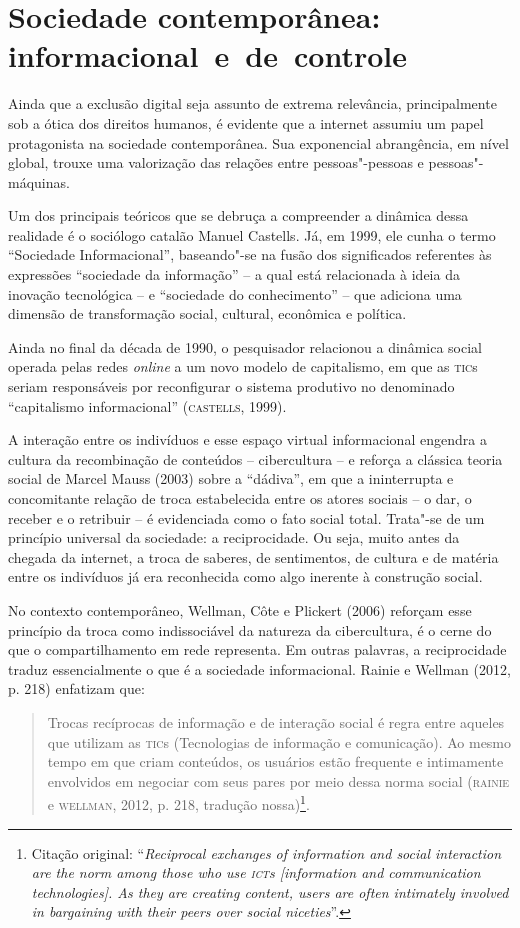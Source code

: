 \section{Sociedade contemporânea: informacional~e~de~controle}

\noindent{}Ainda que a exclusão digital seja assunto de extrema relevância,
principalmente sob a ótica dos direitos humanos, é evidente que a
internet assumiu um papel protagonista na sociedade contemporânea. Sua
exponencial abrangência, em nível global, trouxe uma valorização das
relações entre pessoas"-pessoas e pessoas"-máquinas.

Um dos principais teóricos que se debruça a compreender a dinâmica dessa
realidade é o sociólogo catalão Manuel Castells. Já, em 1999, ele cunha
o termo ``Sociedade Informacional'', baseando"-se na fusão dos
significados referentes às expressões ``sociedade da informação'' -- a
qual está relacionada à ideia da inovação tecnológica -- e ``sociedade do
conhecimento'' -- que adiciona uma dimensão de transformação social,
cultural, econômica e política.

Ainda no final da década de 1990, o pesquisador relacionou a dinâmica
social operada pelas redes \emph{online} a um novo modelo de capitalismo, em
que as \textsc{tic}s seriam responsáveis por reconfigurar o sistema produtivo no
denominado ``capitalismo informacional'' (\textsc{castells}, 1999).

A interação entre os indivíduos e esse espaço virtual informacional
engendra a cultura da recombinação de conteúdos -- cibercultura -- e
reforça a clássica teoria social de Marcel Mauss (2003) sobre a
``dádiva'', em que a ininterrupta e concomitante relação de troca
estabelecida entre os atores sociais -- o dar, o receber e o retribuir
-- é evidenciada como o fato social total. Trata"-se de um princípio
universal da sociedade: a reciprocidade. Ou seja, muito antes da chegada
da internet, a troca de saberes, de sentimentos, de cultura e de matéria
entre os indivíduos já era reconhecida como algo inerente à construção
social.

No contexto contemporâneo, Wellman, Côte e Plickert (2006) reforçam esse
princípio da troca como indissociável da natureza da cibercultura, é o
cerne do que o compartilhamento em rede representa. Em outras palavras,
a reciprocidade traduz essencialmente o que é a sociedade informacional.
Rainie e Wellman (2012, p. 218) enfatizam que:

\begin{quote}
Trocas recíprocas de informação e de interação social é regra entre
aqueles que utilizam as \textsc{tic}s (Tecnologias de informação e comunicação).
Ao mesmo tempo em que criam conteúdos, os usuários estão frequente e
intimamente envolvidos em negociar com seus pares por meio dessa norma
social (\textsc{rainie} e \textsc{wellman}, 2012, p. 218, tradução nossa)\footnote{Citação
  original: ``\emph{Reciprocal exchanges of information and social interaction
        are the norm among those who use \textsc{ict}s {[}information and communication
        technologies{]}. As they are creating content, users are often
        intimately involved in bargaining with their peers over social
        niceties}''.}.
\end{quote}

